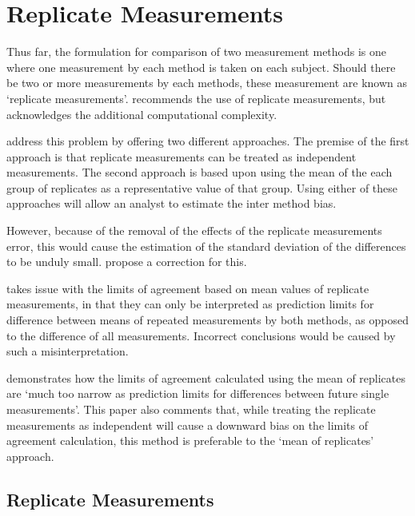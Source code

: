 \documentclass[MAIN.tex]{subfiles}
\begin{document}
	
\section{Replicate Measurements}
	
	Thus far, the formulation for comparison of two measurement
	methods is one where one measurement by each method is taken on	each subject. Should there be two or more measurements by each methods, these measurement are known as `replicate measurements'.
	\citet{BXC2008} recommends the use of replicate measurements, but acknowledges the additional computational complexity.
	
	\citet*{BA86} address this problem by offering two different
	approaches. The premise of the first approach is that replicate
	measurements can be treated as independent measurements. The
	second approach is based upon using the mean of the each group of
	replicates as a representative value of that group. Using either
	of these approaches will allow an analyst to estimate the inter
	method bias.
	
	
	However, because of the removal of the effects of the replicate
	measurements error, this would cause the estimation of the
	standard deviation of the differences to be unduly small.
	\citet*{BA86} propose a correction for this.
	
	\citet{BXC2008} takes issue with the limits of agreement based on
	mean values of replicate measurements, in that they can only be interpreted as prediction
	limits for difference between means of repeated measurements by
	both methods, as opposed to the difference of all measurements.
	Incorrect conclusions would be caused by such a misinterpretation.
	
	\citet{BXC2008} demonstrates how the limits of agreement calculated using the mean of replicates are `much too narrow as prediction limits for differences between future single measurements'. This paper also comments that, while treating the replicate measurements as independent will cause a downward bias on the limits of agreement calculation, this method is preferable to the `mean of replicates' approach.
	

	\subsection{Replicate Measurements}
	
\end{document}
